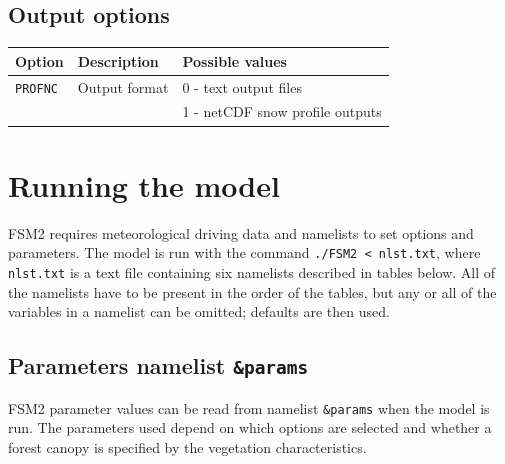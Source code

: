 \documentclass{article}
\begin{document}
\subsection{Output options }
\begin{longtable}{|l|l|l|} \hline
Option       & Description & Possible values \\ \hline
{\tt PROFNC} & Output format
&   0 - text output files               \\
& & 1 - netCDF snow profile outputs     \\ \hline
\end{longtable}

\section{Running the model}

FSM2 requires meteorological driving data and namelists to set options and parameters. The model is run with the command {\tt ./FSM2 < nlst.txt}, where {\tt nlst.txt} is a text file containing six namelists described in tables below. All of the namelists have to be present in the order of the tables, but any or all of the variables in a namelist can be omitted; defaults are then used.

\subsection{Parameters namelist {\tt \&params}}

FSM2 parameter values can be read from namelist {\tt \&params} when the model is run. The parameters used depend on which options are selected and whether a forest canopy is specified by the vegetation characteristics.
\end{document}
